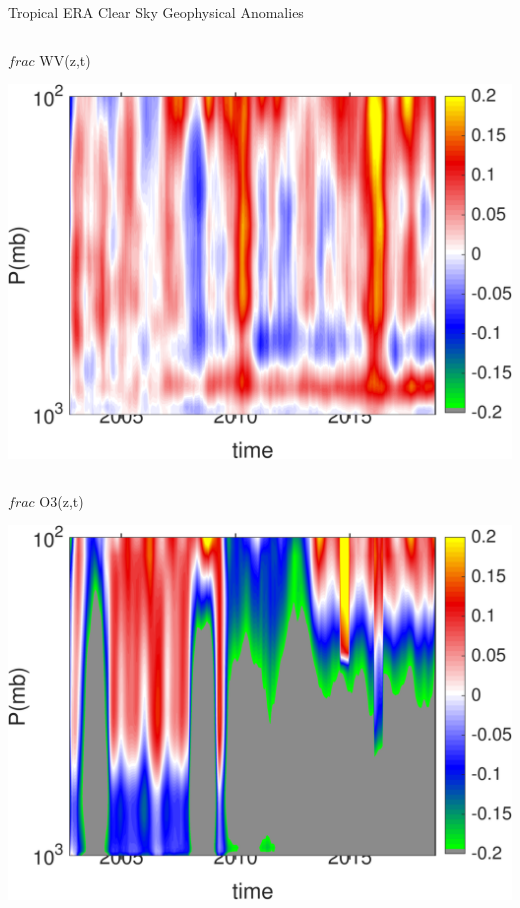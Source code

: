 \documentclass[10pt,t]{beamer}
\begin{document}
\begin{frame}{Tropical ERA Clear Sky Geophysical Anomalies}
\begin{columns}
\begin{column}{0.45\columnwidth}
\begin{block}{\footnotesize $frac$ WV(z,t)}
\vspace{-0.1in}
\begin{center}
\includegraphics[width=\linewidth]{Figs/ClearAnom/era_clr_wv_anom_200209_201808.png}
\end{center}
\end{block}
\end{column}
\end{columns}

\vspace{-0.25in}

\begin{columns}
\begin{column}{0.45\columnwidth}
\begin{block}{\footnotesize $frac$ O3(z,t)}
\vspace{-0.1in}
\begin{center}
\includegraphics[width=\linewidth]{Figs/ClearAnom/era_clr_o3_anom_200209_201808.png}
\end{center}
\end{block}
\end{column}


\end{columns}
\end{frame}
\end{document}
